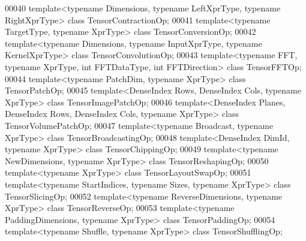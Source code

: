 \begin{DoxyCode}
00040 \textcolor{keyword}{template}<\textcolor{keyword}{typename} Dimensions, \textcolor{keyword}{typename} LeftXprType, \textcolor{keyword}{typename} RightXprType> \textcolor{keyword}{class }TensorContractionOp;
00041 \textcolor{keyword}{template}<\textcolor{keyword}{typename} TargetType, \textcolor{keyword}{typename} XprType> \textcolor{keyword}{class }TensorConversionOp;
00042 \textcolor{keyword}{template}<\textcolor{keyword}{typename} Dimensions, \textcolor{keyword}{typename} InputXprType, \textcolor{keyword}{typename} KernelXprType> \textcolor{keyword}{class }TensorConvolutionOp;
00043 \textcolor{keyword}{template}<\textcolor{keyword}{typename} FFT, \textcolor{keyword}{typename} XprType, \textcolor{keywordtype}{int} FFTDataType, \textcolor{keywordtype}{int} FFTDirection> \textcolor{keyword}{class }TensorFFTOp;
00044 \textcolor{keyword}{template}<\textcolor{keyword}{typename} PatchDim, \textcolor{keyword}{typename} XprType> \textcolor{keyword}{class }TensorPatchOp;
00045 \textcolor{keyword}{template}<DenseIndex Rows, DenseIndex Cols, \textcolor{keyword}{typename} XprType> \textcolor{keyword}{class }TensorImagePatchOp;
00046 \textcolor{keyword}{template}<DenseIndex Planes, DenseIndex Rows, DenseIndex Cols, \textcolor{keyword}{typename} XprType> \textcolor{keyword}{class }TensorVolumePatchOp;
00047 \textcolor{keyword}{template}<\textcolor{keyword}{typename} Broadcast, \textcolor{keyword}{typename} XprType> \textcolor{keyword}{class }TensorBroadcastingOp;
00048 \textcolor{keyword}{template}<DenseIndex DimId, \textcolor{keyword}{typename} XprType> \textcolor{keyword}{class }TensorChippingOp;
00049 \textcolor{keyword}{template}<\textcolor{keyword}{typename} NewDimensions, \textcolor{keyword}{typename} XprType> \textcolor{keyword}{class }TensorReshapingOp;
00050 \textcolor{keyword}{template}<\textcolor{keyword}{typename} XprType> \textcolor{keyword}{class }TensorLayoutSwapOp;
00051 \textcolor{keyword}{template}<\textcolor{keyword}{typename} StartIndices, \textcolor{keyword}{typename} Sizes, \textcolor{keyword}{typename} XprType> \textcolor{keyword}{class }TensorSlicingOp;
00052 \textcolor{keyword}{template}<\textcolor{keyword}{typename} ReverseDimensions, \textcolor{keyword}{typename} XprType> \textcolor{keyword}{class }TensorReverseOp;
00053 \textcolor{keyword}{template}<\textcolor{keyword}{typename} PaddingDimensions, \textcolor{keyword}{typename} XprType> \textcolor{keyword}{class }TensorPaddingOp;
00054 \textcolor{keyword}{template}<\textcolor{keyword}{typename} Shuffle, \textcolor{keyword}{typename} XprType> \textcolor{keyword}{class }TensorShufflingOp;

\end{DoxyCode}
